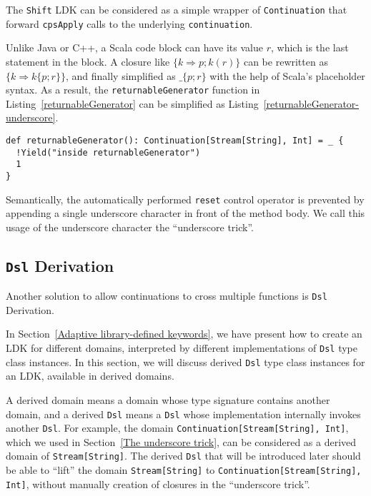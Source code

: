The \lstinline{Shift} LDK can be considered as a simple wrapper of \lstinline{Continuation} that forward \lstinline{cpsApply} calls to the underlying \lstinline{continuation}.

Unlike Java or C++, a Scala code block can have its value $r$, which is the last statement in the block. A closure like $\{ k \Rightarrow p; k(r) \}$ can be rewritten as $\{ k \Rightarrow k \{ p; r \} \}$, and finally simplified as $\_ \{ p; r \}$ with the help of Scala's placeholder syntax. As a result, the \lstinline{returnableGenerator} function in Listing~\ref{returnableGenerator} can be simplified as Listing~\ref{returnableGenerator-underscore}.

\begin{lstlisting}[caption={Returning an additional value in LDK-based generators, written in the underscore trick},label={returnableGenerator-underscore}]
def returnableGenerator(): Continuation[Stream[String], Int] = _ {
  !Yield("inside returnableGenerator")
  1
}
\end{lstlisting}

Semantically, the automatically performed \lstinline{reset} control operator is prevented by appending a single underscore character in front of the method body. We call this usage of the underscore character the ``underscore trick''.

\subsection{\lstinline{Dsl} Derivation}\label{Composable delimited continuation}

Another solution to allow continuations to cross multiple functions is \lstinline{Dsl} Derivation.

In Section~\ref{Adaptive library-defined keywords}, we have present how to create an LDK for different domains, interpreted by different implementations of \lstinline{Dsl} type class instances. In this section, we will discuss derived \lstinline{Dsl} type class instances for an LDK, available in derived domains.

A derived domain means a domain whose type signature contains another domain, and a derived \lstinline{Dsl} means a \lstinline{Dsl} whose implementation internally invokes another \lstinline{Dsl}. For example, the domain \lstinline{Continuation[Stream[String], Int]}, which we used in Section~\ref{The underscore trick}, can be considered as a derived domain of \lstinline{Stream[String]}. The derived \lstinline{Dsl} that will be introduced later should be able to ``lift'' the domain \lstinline{Stream[String]} to \lstinline{Continuation[Stream[String], Int]}, without manually creation of closures in the ``underscore trick''.

